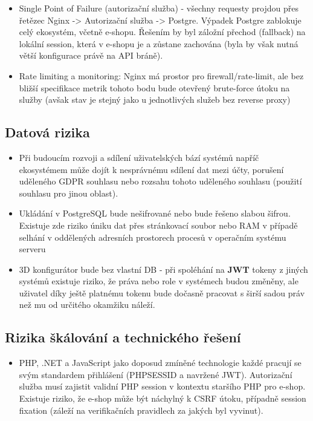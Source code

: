 \documentclass[a4paper,12pt]{article}
\begin{document}
\begin{itemize}

\item Single Point of Failure (autorizační služba) - všechny requesty projdou přes řetězec Nginx -> Autorizační služba -> Postgre. Výpadek Postgre zablokuje celý ekosystém, včetně e-shopu. Řešením by byl záložní přechod (fallback) na lokální session, která v e-shopu je a zůstane zachována (byla by však nutná větší konfigurace právě na API bráně).

\item Rate limiting a monitoring: Nginx má prostor pro firewall/rate-limit, ale bez bližší specifikace metrik tohoto bodu bude otevřený brute-force útoku na služby (avšak stav je stejný jako u jednotlivých služeb bez reverse proxy)

\end{itemize}

\subsection{Datová rizika}

\begin{itemize}

\item Při budoucím rozvoji a sdílení uživatelských bází systémů napříč ekosystémem může dojít k nesprávnému sdílení dat mezi účty, porušení uděleného GDPR souhlasu nebo rozsahu tohoto uděleného souhlasu (použití souhlasu pro jinou oblast).

\item Ukládání v PostgreSQL bude nešifrované nebo bude řešeno slabou šifrou. Existuje zde riziko úniku dat přes stránkovací soubor nebo RAM v případě selhání v oddělených adresních prostorech procesů v operačním systému serveru

\item 3D konfigurátor bude bez vlastní DB - při spoléhání na \textbf{JWT}
 tokeny z jiných systémů existuje riziko, že práva nebo role v systémech budou změněny, ale uživatel díky ještě platnému tokenu bude dočasně pracovat s širší sadou práv než mu od určitého okamžiku náleží.

\end{itemize}

\subsection{Rizika škálování a technického řešení}

\begin{itemize}

\item PHP, .NET a JavaScript jako doposud zmíněné technologie každé pracují se svým standardem přihlášení (PHPSESSID a navržené JWT). Autorizační služba musí zajistit validní PHP session v kontextu staršího PHP pro e-shop. Existuje riziko, že e-shop může být náchylný k CSRF útoku, případně session fixation (záleží na verifikačních pravidlech za jakých byl vyvinut).

\end{itemize}
\end{document}
